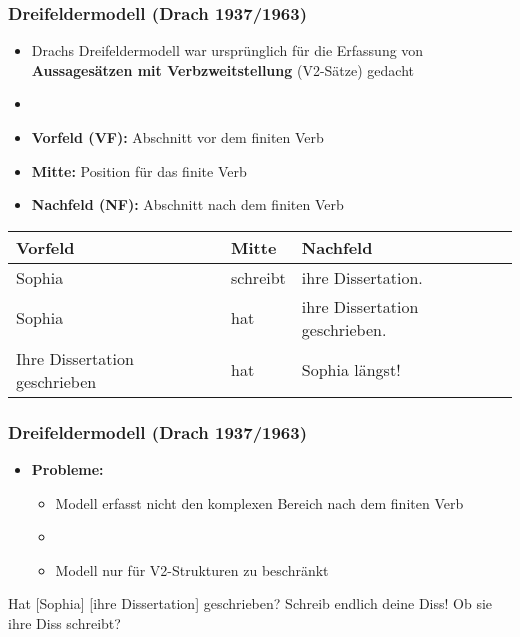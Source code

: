 \begin{frame}
\frametitle{Dreifeldermodell (Drach 1937/1963)}

\begin{itemize}
	\item Drachs Dreifeldermodell war ursprünglich für die Erfassung von \textbf{Aussagesätzen mit Verbzweitstellung} (V2-Sätze) gedacht
	\item[]
	\item \textbf{Vorfeld (VF):} Abschnitt vor dem finiten Verb
	\item \textbf{Mitte:} Position für das finite Verb
	\item \textbf{Nachfeld (NF):} Abschnitt nach dem finiten Verb
\end{itemize}

\pause

\begin{table}
\centering

\begin{tabular}{l|l|l}
\textbf{Vorfeld} & \textbf{Mitte} & \textbf{Nachfeld} \\ 
\hline 
Sophia & \alert{schreibt} & ihre Dissertation. \\ 
\hline
\pause
Sophia & \alert{hat}  & ihre Dissertation geschrieben. \\ 
\hline 
\pause
Ihre Dissertation geschrieben & \alert{hat} & Sophia längst!\\ 
\end{tabular} 

\end{table}

\end{frame}


\begin{frame}
\frametitle{Dreifeldermodell (Drach 1937/1963)}

\begin{itemize}
	\item \textbf{Probleme:}
	
	\begin{itemize}
		\item Modell erfasst nicht den komplexen Bereich nach dem finiten Verb
		\item[]
		\item Modell nur für V2-Strukturen \ras zu beschränkt		
	\end{itemize}
\end{itemize}

\pause

\eal
\ex \alert{Hat} [Sophia] [ihre Dissertation] \alert{geschrieben}?
\ex \alert{Schreib} endlich deine Diss!
\ex	\alert{Ob} sie ihre Diss \alert{schreibt}?
\zl


\end{frame}


